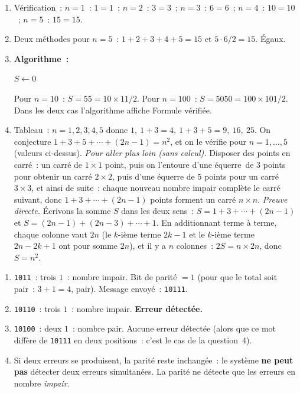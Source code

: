 
\begin{enumerate}
  \item V\'erification~: $n=1$~: $1=1$\checkmark~; $n=2$~: $3=3$\checkmark~;
        $n=3$~: $6=6$\checkmark~; $n=4$~: $10=10$\checkmark~; $n=5$~: $15=15$\checkmark.
  \item Deux m\'ethodes pour $n=5$~: $1+2+3+4+5=15$ et $5\cdot6/2=15$. \'Egaux.\checkmark
  \item \textbf{Algorithme~:}
\begin{algorithm}[H]
\caption{V\'erification de la formule de Gauss}
$S \leftarrow 0$\;
\end{algorithm}
        Pour $n=10$~: $S=55=10\times11/2$. Pour $n=100$~: $S=5050=100\times101/2$.
        Dans les deux cas l'algorithme affiche \og Formule v\'erifi\'ee\fg.
  \item Tableau~: $n=1,2,3,4,5$ donne $1,\ 1+3=4,\ 1+3+5=9,\ 16,\ 25$.
        On conjecture $1+3+5+\cdots+(2n-1)=n^2$, et on le v\'erifie pour $n=1,\ldots,5$
        (valeurs ci-dessus).
        \emph{Pour aller plus loin (sans calcul).} Disposer des points en carr\'e~:
        un carr\'e de $1\times1$ point, puis on l'entoure d'une \og \'equerre\fg\ de $3$ points
        pour obtenir un carr\'e $2\times2$, puis d'une \'equerre de $5$ points pour un carr\'e
        $3\times3$, et ainsi de suite~: chaque nouveau nombre impair compl\`ete le carr\'e suivant,
        donc $1+3+\cdots+(2n-1)$ points forment un carr\'e $n\times n$.
        \emph{Preuve directe.} \'Ecrivons la somme $S$ dans les deux sens~:
        $S=1+3+\cdots+(2n-1)$ et $S=(2n-1)+(2n-3)+\cdots+1$.
        En additionnant terme \`a terme, chaque colonne vaut $2n$
        (le $k$-i\`eme terme $2k-1$ et le $k$-i\`eme terme $2n-2k+1$ ont pour somme $2n$),
        et il y a $n$ colonnes~: $2S=n\times2n$, donc $S=n^2$.
\end{enumerate}


\begin{enumerate}
  \item \texttt{1011}~: trois $1$~: nombre impair. Bit de parit\'e $= 1$
        (pour que le total soit pair~: $3+1=4$, pair).
        Message envoy\'e~: \texttt{10111}.
  \item \texttt{10110}~: trois $1$~: nombre impair. \textbf{Erreur d\'etect\'ee.}
  \item \texttt{10100}~: deux $1$~: nombre pair. Aucune erreur d\'etect\'ee
        (alors que ce mot diff\`ere de \texttt{10111} en deux positions~:
        c'est le cas de la question~4).
  \item Si deux erreurs se produisent, la parit\'e reste inchang\'ee~:
        le syst\`eme \textbf{ne peut pas} d\'etecter deux erreurs simultan\'ees.
        La parit\'e ne d\'etecte que les erreurs en nombre \emph{impair}.
\end{enumerate}

